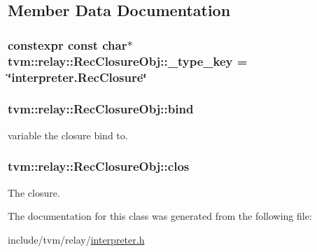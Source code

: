 \subsection{Member Data Documentation}
\subsubsection[{\texorpdfstring{\+\_\+type\+\_\+key}{_type_key}}]{\setlength{\rightskip}{0pt plus 5cm}constexpr const char$\ast$ tvm\+::relay\+::\+Rec\+Closure\+Obj\+::\+\_\+type\+\_\+key = \char`\"{}interpreter.\+Rec\+Closure\char`\"{}\hspace{0.3cm}{\ttfamily [static]}}\hypertarget{classtvm_1_1relay_1_1RecClosureObj_a7781e8be19a1df8072a94fba6594da6e}{}\label{classtvm_1_1relay_1_1RecClosureObj_a7781e8be19a1df8072a94fba6594da6e}
\subsubsection[{\texorpdfstring{bind}{bind}}]{ tvm\+::relay\+::\+Rec\+Closure\+Obj\+::bind}\hypertarget{classtvm_1_1relay_1_1RecClosureObj_ac275a8446970b548e574370b6795316f}{}\label{classtvm_1_1relay_1_1RecClosureObj_ac275a8446970b548e574370b6795316f}


variable the closure bind to. 

\subsubsection[{\texorpdfstring{clos}{clos}}]{ tvm\+::relay\+::\+Rec\+Closure\+Obj\+::clos}\hypertarget{classtvm_1_1relay_1_1RecClosureObj_a7a56c67a71f2d6d6621cdb0747b9dce0}{}\label{classtvm_1_1relay_1_1RecClosureObj_a7a56c67a71f2d6d6621cdb0747b9dce0}


The closure. 



The documentation for this class was generated from the following file\+:\begin{DoxyCompactItemize}
\item 
include/tvm/relay/\hyperlink{interpreter_8h}{interpreter.\+h}\end{DoxyCompactItemize}
